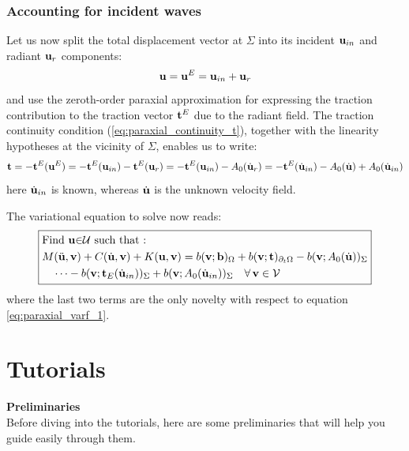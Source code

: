 \documentclass{report}
\newcommand{\bb}{\textbf{b}}
\newcommand{\bu}{\textbf{u}}
\newcommand{\bv}{\textbf{v}}
\newcommand{\bt}{\boldsymbol t}
\def\bb{{\bf{b}}}
\def\bt{{\bf t}}
\def\bu{{\bf{u}}}
\def\bv{{\bf{v}}}
\begin{document}
\subsection{Accounting for incident waves}
%
Let us now split the total displacement vector at $\Sigma$ into its incident $\bu_{in}$ and radiant $\bu_{r}$ components:
%
\begin{equation}
\bu=\bu^{E}=\bu_{in}+\bu_{r}
\end{equation}
%
and use the zeroth-order paraxial approximation for expressing the traction contribution to the traction vector $\bt^{E}$ due to the radiant field. The traction continuity condition (\ref{eq:paraxial_continuity_t}),
together with the linearity hypotheses at the vicinity of $\Sigma$, enables us to write:
%
\begin{equation}
\bt=-\bt^{E}(\bu^{E})=-\bt^{E}(\bu_{in})-\bt^{E}(\bu_{r})=-\bt^{E}(\bu_{in})-A_{0}(\dot{\bu}_{r})=-\bt^{E}(\dot{\bu}_{in})-A_{0}(\dot{\bu})+A_{0}(\dot{\bu}_{in})
\end{equation}
%
here $\dot{\bu}_{in}$ is known, whereas $\dot{\bu}$ is the unknown velocity field. 

The variational equation to solve now reads:
\begin{equation}
\boxed{\begin{aligned} & \text{Find \ensuremath{\bu}\ensuremath{\in}\ensuremath{\mathcal{U}} such that : }\\
 & M(\ddot{\bu},\bv)+C(\dot{\bu},\bv)+K(\bu,\bv)=b(\bv;\bb)_{\Omega}+b(\bv;\bt)_{\partial_{t}\Omega}-b(\bv;A_{0}(\dot{\bu}))_{\Sigma}\\
 & \quad\cdots-b(\bv;\bt_{E}(\dot{\bu}_{in}))_{\Sigma}+b(\bv;A_{0}(\dot{\bu}_{in}))_{\Sigma}\quad\forall\,\bv\in\mathcal{V}
\end{aligned}
}
\end{equation}
%
where the last two terms are the only novelty with respect to equation \eqref{eq:paraxial_varf_1}.

\chapter{Tutorials}

\textbf{Preliminaries}\\
Before diving into the tutorials, here are some preliminaries that will help you guide easily through them.
\end{document}
